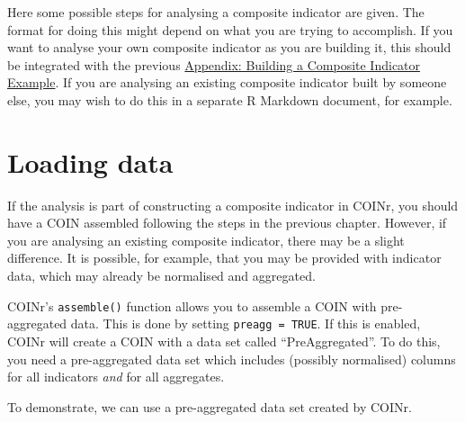 \documentclass[
]{book}
\newenvironment{Shaded}{\begin{snugshade}}{\end{snugshade}}
\newcommand{\AttributeTok}[1]{\textcolor[rgb]{0.77,0.63,0.00}{#1}}
\newcommand{\CommentTok}[1]{\textcolor[rgb]{0.56,0.35,0.01}{\textit{#1}}}
\newcommand{\ConstantTok}[1]{\textcolor[rgb]{0.00,0.00,0.00}{#1}}
\newcommand{\FunctionTok}[1]{\textcolor[rgb]{0.00,0.00,0.00}{#1}}
\newcommand{\NormalTok}[1]{#1}
\newcommand{\OtherTok}[1]{\textcolor[rgb]{0.56,0.35,0.01}{#1}}
\newcommand{\SpecialCharTok}[1]{\textcolor[rgb]{0.00,0.00,0.00}{#1}}
\begin{document}
Here some possible steps for analysing a composite indicator are given. The format for doing this might depend on what you are trying to accomplish. If you want to analyse your own composite indicator as you are building it, this should be integrated with the previous \protect\hyperlink{appendix-building-a-composite-indicator-example}{Appendix: Building a Composite Indicator Example}. If you are analysing an existing composite indicator built by someone else, you may wish to do this in a separate R Markdown document, for example.

\hypertarget{loading-data}{%
\section{Loading data}\label{loading-data}}

If the analysis is part of constructing a composite indicator in COINr, you should have a COIN assembled following the steps in the previous chapter. However, if you are analysing an existing composite indicator, there may be a slight difference. It is possible, for example, that you may be provided with indicator data, which may already be normalised and aggregated.

COINr's \texttt{assemble()} function allows you to assemble a COIN with pre-aggregated data. This is done by setting \texttt{preagg\ =\ TRUE}. If this is enabled, COINr will create a COIN with a data set called ``PreAggregated''. To do this, you need a pre-aggregated data set which includes (possibly normalised) columns for all indicators \emph{and} for all aggregates.

To demonstrate, we can use a pre-aggregated data set created by COINr.

\begin{Shaded}
\end{Shaded}
\end{document}
